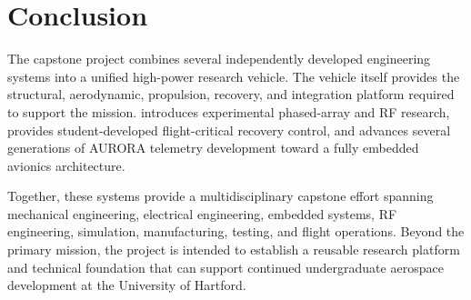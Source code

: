 \section{Conclusion}

The \ares{} capstone project combines several independently developed engineering systems into a unified high-power research vehicle. The vehicle itself provides the structural, aerodynamic, propulsion, recovery, and integration platform required to support the mission. \phobos{} introduces experimental phased-array and RF research, \comet{} provides student-developed flight-critical recovery control, and \deimos{} advances several generations of AURORA telemetry development toward a fully embedded avionics architecture.

Together, these systems provide a multidisciplinary capstone effort spanning mechanical engineering, electrical engineering, embedded systems, RF engineering, simulation, manufacturing, testing, and flight operations. Beyond the primary mission, the project is intended to establish a reusable research platform and technical foundation that can support continued undergraduate aerospace development at the University of Hartford.